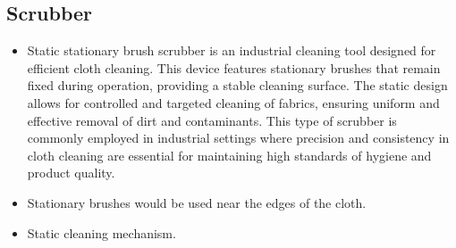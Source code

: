\documentclass[table,french,english]{rapportCS}
\begin{document}


\subsection{Scrubber}
\begin{itemize}[label=$\bullet$]
    \item Static stationary brush scrubber is an industrial cleaning tool designed for efficient cloth cleaning. This device features stationary brushes that remain fixed during operation, providing a stable cleaning surface. The static design allows for controlled and targeted cleaning of fabrics, ensuring uniform and effective removal of dirt and contaminants. This type of scrubber is commonly employed in industrial settings where precision and consistency in cloth cleaning are essential for maintaining high standards of hygiene and product quality.
    \item Stationary brushes would be used near the edges of the cloth.
    \item Static cleaning mechanism.
    
\end{itemize}
\end{document}

